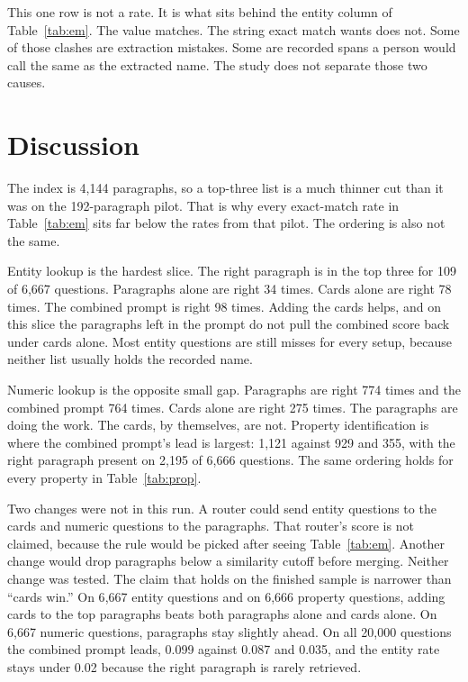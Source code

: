\documentclass[conference]{IEEEtran}
\begin{document}
This one row is not a rate. It is what sits behind the entity column of Table~\ref{tab:em}. The value matches. The string exact match wants does not. Some of those clashes are extraction mistakes. Some are recorded spans a person would call the same as the extracted name. The study does not separate those two causes.

\section{Discussion}
The index is 4{,}144 paragraphs, so a top-three list is a much thinner cut than it was on the 192-paragraph pilot. That is why every exact-match rate in Table~\ref{tab:em} sits far below the rates from that pilot. The ordering is also not the same.

Entity lookup is the hardest slice. The right paragraph is in the top three for 109 of 6{,}667 questions. Paragraphs alone are right 34 times. Cards alone are right 78 times. The combined prompt is right 98 times. Adding the cards helps, and on this slice the paragraphs left in the prompt do not pull the combined score back under cards alone. Most entity questions are still misses for every setup, because neither list usually holds the recorded name.

Numeric lookup is the opposite small gap. Paragraphs are right 774 times and the combined prompt 764 times. Cards alone are right 275 times. The paragraphs are doing the work. The cards, by themselves, are not. Property identification is where the combined prompt's lead is largest: 1{,}121 against 929 and 355, with the right paragraph present on 2{,}195 of 6{,}666 questions. The same ordering holds for every property in Table~\ref{tab:prop}.

Two changes were not in this run. A router could send entity questions to the cards and numeric questions to the paragraphs. That router's score is not claimed, because the rule would be picked after seeing Table~\ref{tab:em}. Another change would drop paragraphs below a similarity cutoff before merging. Neither change was tested. The claim that holds on the finished sample is narrower than ``cards win.'' On 6{,}667 entity questions and on 6{,}666 property questions, adding cards to the top paragraphs beats both paragraphs alone and cards alone. On 6{,}667 numeric questions, paragraphs stay slightly ahead. On all 20{,}000 questions the combined prompt leads, 0.099 against 0.087 and 0.035, and the entity rate stays under 0.02 because the right paragraph is rarely retrieved.
\end{document}
